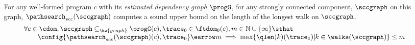\begin{lem}
  \label{lem:sound_adaptalg_scc}
  For any well-formed program $c$ with its \emph{estimated dependency graph} $\progG$, 
for any strongly connected component,  $\sccgraph$ on this graph, 
$\pathsearch_{scc}(\sccgraph)$ computes a sound upper bound on the length
of the longest walk on $\sccgraph$.
  \[
    \begin{array}{l}
      \forall c \in \cdom, \sccgraph \subseteq_{\kw{graph}} \progG(c),
    \trace_0 \in \ftdom_0(c), m \in \mathbb{N} \cup \{\infty\} \sthat
    \\ \qquad   
      \config{\pathsearch_{scc}(\sccgraph)(c), \trace_0} \earrow m
      \implies
    \max\{\qlen(k)(\trace_0) | k \in \walks(\sccgraph)\} \leq m
  \end{array}
  \]
\end{lem}

